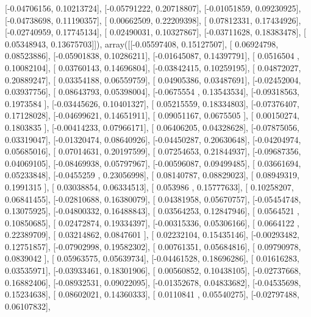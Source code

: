 \documentclass{article}
\begin{document}
       [-0.04706156,  0.10213724],
       [-0.05791222,  0.20718807],
       [-0.01051859,  0.09230925],
       [-0.04738698,  0.11190357],
       [ 0.00662509,  0.22209398],
       [ 0.07812331,  0.17434926],
       [-0.02740959,  0.17745134],
       [ 0.02490031,  0.10327867],
       [-0.03711628,  0.18383478],
       [ 0.05348943,  0.13675703]]), array([[-0.05597408,  0.15127507],
       [ 0.06924798,  0.08523886],
       [-0.05901838,  0.10286211],
       [-0.01645087,  0.14397791],
       [ 0.0516504 ,  0.10082104],
       [ 0.03760143,  0.14696804],
       [-0.03842415,  0.10259195],
       [ 0.04872027,  0.20889247],
       [ 0.03354188,  0.06559759],
       [ 0.04905386,  0.03487691],
       [-0.02452004,  0.03937756],
       [ 0.08643793,  0.05398004],
       [-0.0675554 ,  0.13543534],
       [-0.09318563,  0.1973584 ],
       [-0.03445626,  0.10401327],
       [ 0.05215559,  0.18334803],
       [-0.07376407,  0.17128028],
       [-0.04699621,  0.14651911],
       [ 0.09051167,  0.0675505 ],
       [ 0.00150274,  0.1803835 ],
       [-0.00414233,  0.07966171],
       [ 0.06406205,  0.04328628],
       [-0.07875056,  0.03319047],
       [-0.01320474,  0.08640926],
       [-0.04450287,  0.20630648],
       [-0.04204974,  0.05685016],
       [ 0.07014631,  0.20197599],
       [ 0.07254653,  0.21844937],
       [-0.09687356,  0.04069105],
       [-0.08469938,  0.05797967],
       [-0.00596087,  0.09499485],
       [ 0.03661694,  0.05233848],
       [-0.0455259 ,  0.23056998],
       [ 0.08140787,  0.08829023],
       [ 0.08949319,  0.1991315 ],
       [ 0.03038854,  0.06334513],
       [ 0.053986  ,  0.15777633],
       [ 0.10258207,  0.06841455],
       [-0.02810688,  0.16380079],
       [ 0.04381958,  0.05670757],
       [-0.05454748,  0.13075925],
       [-0.04800332,  0.16488843],
       [ 0.03564253,  0.12847946],
       [ 0.0564521 ,  0.10850685],
       [ 0.02472874,  0.19334397],
       [-0.00315336,  0.05306166],
       [ 0.0664122 ,  0.22389709],
       [ 0.03214862,  0.0847601 ],
       [ 0.02232104,  0.15435146],
       [-0.00293482,  0.12751857],
       [-0.07902998,  0.19582302],
       [ 0.00761351,  0.05684816],
       [ 0.09790978,  0.0839042 ],
       [ 0.05963575,  0.05639734],
       [-0.04461528,  0.18696286],
       [ 0.01616283,  0.03535971],
       [-0.03933461,  0.18301906],
       [ 0.00560852,  0.10438105],
       [-0.02737668,  0.16882406],
       [-0.08932531,  0.09022095],
       [-0.01352678,  0.04833682],
       [-0.04535698,  0.15234638],
       [ 0.08602021,  0.14360333],
       [ 0.0110841 ,  0.05540275],
       [-0.02797488,  0.06107832],
\end{document}
